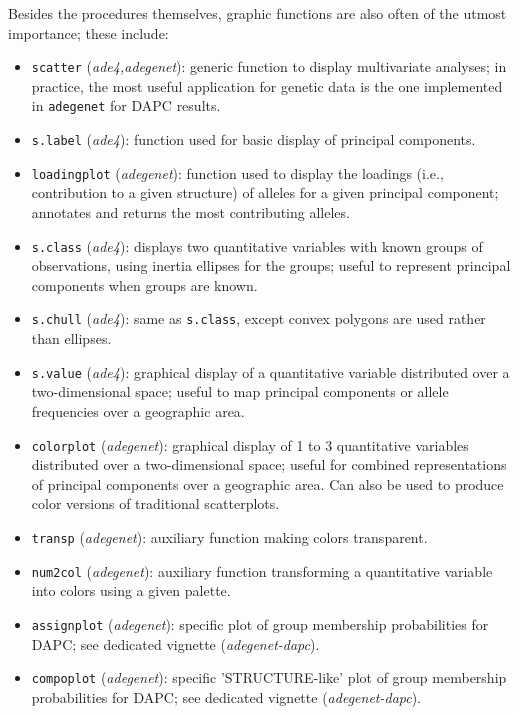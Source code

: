 \documentclass{article}
\begin{document}
Besides the procedures themselves, graphic functions are also often of the utmost importance; these include:
\begin{itemize}
  \item \texttt{scatter} (\textit{ade4,adegenet}): generic function to display multivariate
    analyses; in practice, the most useful application for genetic data is the one implemented in
    \texttt{adegenet} for DAPC results.
  \item \texttt{s.label} (\textit{ade4}): function used for basic display of principal components.
  \item \texttt{loadingplot} (\textit{adegenet}): function used to display the loadings (i.e.,
    contribution to a given structure) of alleles for a given principal component; annotates and returns the most
    contributing alleles.
  \item \texttt{s.class} (\textit{ade4}): displays two quantitative variables with known groups of
    observations, using inertia ellipses for the groups; useful to represent principal components
    when groups are known.
  \item \texttt{s.chull} (\textit{ade4}): same as \texttt{s.class}, except convex polygons are used
    rather than ellipses.
  \item \texttt{s.value} (\textit{ade4}): graphical display of a quantitative variable distributed
    over a two-dimensional space; useful to map principal components or allele frequencies over a
    geographic area.
  \item \texttt{colorplot} (\textit{adegenet}): graphical display of 1 to 3 quantitative variables distributed
    over a two-dimensional space; useful for combined representations of principal components over a geographic area.
    Can also be used to produce color versions of traditional scatterplots.
  \item \texttt{transp} (\textit{adegenet}): auxiliary function making colors transparent.
  \item \texttt{num2col} (\textit{adegenet}): auxiliary function transforming a quantitative
    variable into colors using a given palette.
  \item \texttt{assignplot} (\textit{adegenet}): specific plot of group membership probabilities for
    DAPC; see dedicated vignette (\textit{adegenet-dapc}).
  \item \texttt{compoplot} (\textit{adegenet}): specific 'STRUCTURE-like' plot of group membership probabilities for
    DAPC; see dedicated vignette (\textit{adegenet-dapc}).

\end{itemize}
\end{document}
